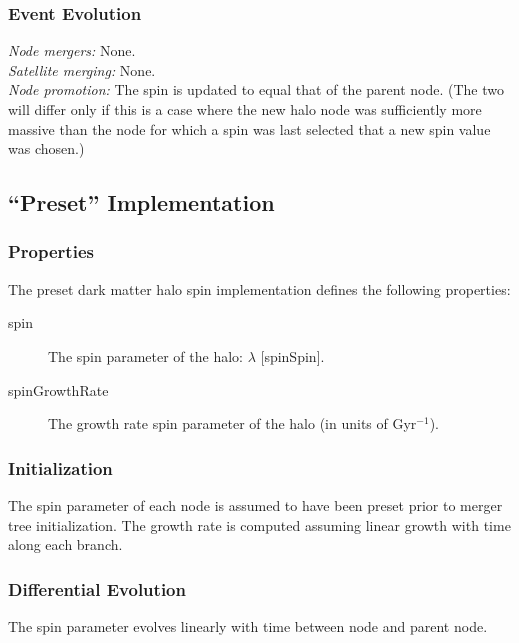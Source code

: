 \subsubsection{Event Evolution}

\noindent\emph{Node mergers:} None.\\

\noindent\emph{Satellite merging:} None.\\

\noindent\emph{Node promotion:} The spin is updated to equal that of the parent node. (The two will differ only if this is a case where the new halo \gls{node} was sufficiently more massive than the \gls{node} for which a spin was last selected that a new spin value was chosen.)\\

\subsection{``Preset'' Implementation}

\subsubsection{Properties}

The preset dark matter halo spin implementation defines the following properties:
\begin{description}
 \item [{\normalfont \ttfamily spin}] The spin parameter of the halo: $\lambda$ [{\normalfont \ttfamily spinSpin}].
 \item [{\normalfont \ttfamily spinGrowthRate}] The growth rate spin parameter of the halo (in units of Gyr$^{-1}$).
\end{description}

\subsubsection{Initialization}

The spin parameter of each \gls{node} is assumed to have been preset prior to merger tree initialization. The growth rate is computed assuming linear growth with time along each branch.

\subsubsection{Differential Evolution}

The spin parameter evolves linearly with time between \gls{node} and parent node.

